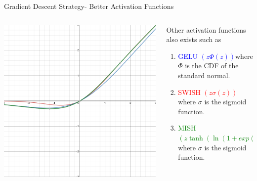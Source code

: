 \begin{frame}{Gradient Descent Strategy- Better Activation Functions}
	\begin{columns}[T]
        \begin{column}{0.5\textwidth}
        	\includegraphics[width=\textwidth]{images/MISH.png}
        \end{column}
	    \begin{column}{0.5\textwidth}
    	    Other activation functions also exists such as 
			\begin{enumerate}[$\bullet$]
				\item \textcolor{blue}{GELU $\left(z\Phi(z)\right)$}where $\Phi$ is the CDF of the standard normal.
				\item \textcolor{red}{SWISH $\left(z\sigma(z)\right)$}where $\sigma$ is the sigmoid function.
				\item \textcolor{green}{MISH $\left(z\tanh(\ln(1+exp(z)))\right)$}where $\sigma$ is the sigmoid function.
			\end{enumerate}
    	\end{column}
    \end{columns}
\end{frame}

